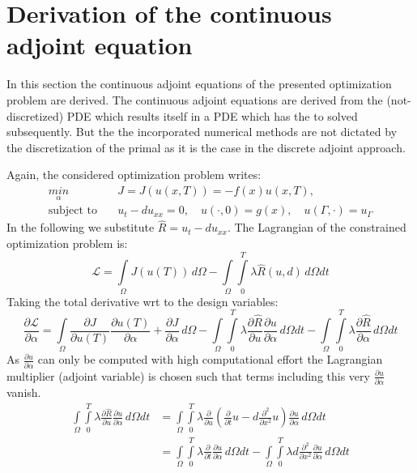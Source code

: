 \section{Derivation of the continuous adjoint equation}
In this section the continuous adjoint equations of the presented optimization problem are derived. The continuous adjoint equations are derived from the (not-discretized) PDE which results itself in a PDE which has the to solved subsequently. But the the incorporated numerical methods are not dictated by the discretization of the primal as it is the case in the discrete adjoint approach.

Again, the considered optimization problem writes: 
\begin{align}
\underset{\alpha}{min}\quad &J = J \left( u(x,T) \right) = -f(x)u(x,T), \\
\text{subject to}\quad &u_t-du_{xx} = 0,\quad u(\cdot,0) = g(x),\quad u(\Gamma,\cdot) = u_{\Gamma}
\end{align}
In the following we substitute $\hat{R} = u_t-du_{xx}$. The Lagrangian of the constrained optimization problem is:
\begin{equation}
\mathcal{L} = \int\limits_{\Omega} J(u(T)) \,d\Omega - \int\limits_{\Omega}\int\limits_{0}^{T} \lambda \hat{R}(u,d) \,d\Omega dt
\end{equation}
Taking the total derivative wrt to the design variables: 
\begin{equation}
\frac{\partial\mathcal{L}}{\partial \alpha} = \int\limits_{\Omega} \frac{\partial J}{\partial u(T)} \frac{\partial u(T)}{\partial \alpha} + \frac{\partial J}{\partial \alpha} \,d\Omega - \int\limits_{\Omega}\int\limits_{0}^{T} \lambda \frac{\partial \hat{R}}{\partial u} \frac{\partial u}{\partial \alpha} \,d\Omega dt  - \int\limits_{\Omega}\int\limits_{0}^{T} \lambda \frac{\partial \hat{R}}{\partial \alpha} \,d\Omega dt
\end{equation}
As $\frac{\partial u}{\partial \alpha}$ can only be computed with high computational effort the Lagrangian multiplier (adjoint variable) is chosen such that terms including this very $\frac{\partial u}{\partial \alpha}$ vanish.
\begin{align}
\int\limits_{\Omega}\int\limits_{0}^{T} \lambda \frac{\partial \hat{R}}{\partial u} \frac{\partial u}{\partial \alpha} \,d\Omega dt &= \int\limits_{\Omega}\int\limits_{0}^{T} \lambda \frac{\partial }{\partial u} \left( \frac{\partial}{\partial t}u - d \frac{\partial^2}{\partial x^2}u \right) \frac{\partial u}{\partial \alpha} \,d\Omega dt\\
&= \int\limits_{\Omega}\int\limits_{0}^{T} \lambda \frac{\partial}{\partial t} \frac{\partial u}{\partial \alpha} \,d\Omega dt - \int\limits_{\Omega}\int\limits_{0}^{T} \lambda d \frac{\partial^2}{\partial x^2} \frac{\partial u}{\partial \alpha} \,d\Omega dt
\end{align}
